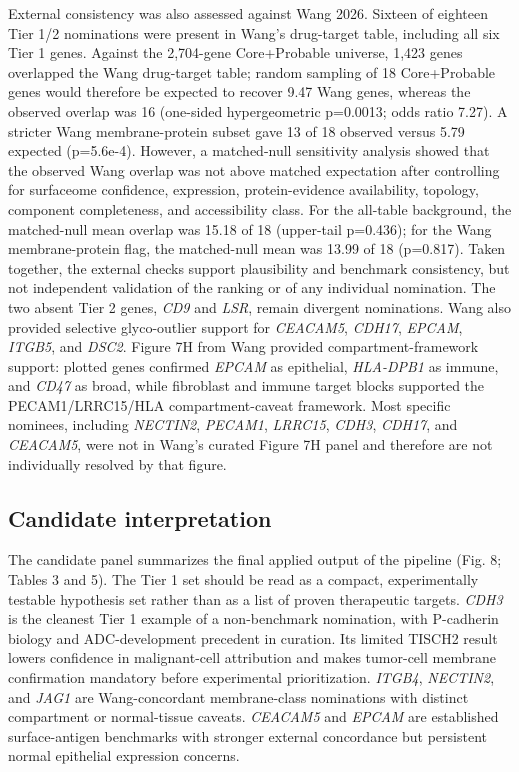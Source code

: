 \documentclass[twocolumn]{article}
\begin{document}
External consistency was also assessed against Wang 2026. Sixteen of eighteen Tier 1/\allowbreak{}2 nominations were present in Wang's drug-target table, including all six Tier 1 genes. Against the 2,704-gene Core+\allowbreak{}Probable universe, 1,423 genes overlapped the Wang drug-target table; random sampling of 18 Core+\allowbreak{}Probable genes would therefore be expected to recover 9.47 Wang genes, whereas the observed overlap was 16 (one-sided hypergeometric p=0.0013; odds ratio 7.27). A stricter Wang membrane-protein subset gave 13 of 18 observed versus 5.79 expected (p=5.6e-4). However, a matched-null sensitivity analysis showed that the observed Wang overlap was not above matched expectation after controlling for surfaceome confidence, expression, protein-evidence availability, topology, component completeness, and accessibility class. For the all-table background, the matched-null mean overlap was 15.18 of 18 (upper-tail p=0.436); for the Wang membrane-protein flag, the matched-null mean was 13.99 of 18 (p=0.817). Taken together, the external checks support plausibility and benchmark consistency, but not independent validation of the ranking or of any individual nomination. The two absent Tier 2 genes, \textit{CD9} and \textit{LSR}, remain divergent nominations. Wang also provided selective glyco-outlier support for \textit{CEACAM5}, \textit{CDH17}, \textit{EPCAM}, \textit{ITGB5}, and \textit{DSC2}. Figure 7H from Wang provided compartment-framework support: plotted genes confirmed \textit{EPCAM} as epithelial, \textit{HLA-DPB1} as immune, and \textit{CD47} as broad, while fibroblast and immune target blocks supported the PECAM1/\allowbreak{}LRRC15/\allowbreak{}HLA compartment-caveat framework. Most specific nominees, including \textit{NECTIN2}, \textit{PECAM1}, \textit{LRRC15}, \textit{CDH3}, \textit{CDH17}, and \textit{CEACAM5}, were not in Wang's curated Figure 7H panel and therefore are not individually resolved by that figure.

\subsection{Candidate interpretation}

The candidate panel summarizes the final applied output of the pipeline (Fig. 8; Tables 3 and 5). The Tier 1 set should be read as a compact, experimentally testable hypothesis set rather than as a list of proven therapeutic targets. \textit{CDH3} is the cleanest Tier 1 example of a non-benchmark nomination, with P-cadherin biology and ADC-development precedent in curation. Its limited TISCH2 result lowers confidence in malignant-cell attribution and makes tumor-cell membrane confirmation mandatory before experimental prioritization. \textit{ITGB4}, \textit{NECTIN2}, and \textit{JAG1} are Wang-concordant membrane-class nominations with distinct compartment or normal-tissue caveats. \textit{CEACAM5} and \textit{EPCAM} are established surface-antigen benchmarks with stronger external concordance but persistent normal epithelial expression concerns.
\end{document}
